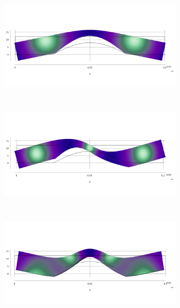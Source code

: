 \documentclass[a4paper]{article}
\begin{document}
\begin{figure}[h]
	\centering
	\begin{subfigure}{0.3\linewidth}
		\centering
		\includegraphics[width=0.95\linewidth]{01c.png}
	\end{subfigure}
	~
	\begin{subfigure}{0.3\linewidth}
		\centering
		\includegraphics[width=0.95\linewidth]{02c.png}
	\end{subfigure}
	~
	\begin{subfigure}{0.3\linewidth}
		\centering
		\includegraphics[width=0.95\linewidth]{03c.png}
	\end{subfigure}
	

\end{figure}
\end{document}
